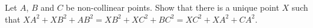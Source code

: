 Let $A$, $B$ and $C$ be non-collinear points. Show that there is a unique point $X$ such that $XA^2 + XB^2 + AB^2 = XB^2 + XC^2 + BC^2 = XC^2 + XA^2 + CA^2$.
